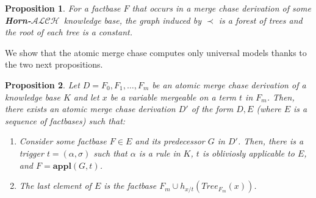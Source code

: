 \documentclass{article}
\newtheorem{proposition}{Proposition}[section]
\theoremstyle{definition}
\newtheorem{definition}{Definition}[section]
\theoremstyle{remark}
\newcommand{\Appl}{\textbf{appl}}
\newcommand{\Tree}{\textit{Tree}}
\newcommand{\ALCH}{\textbf{Horn-$\mathcal{ALCH}$}}
\begin{document}
\begin{proposition}
For a factbase $F$ that occurs in a merge chase derivation of some \ALCH\ knowledge base, the graph induced by $\prec$ is a forest of trees and the root of each tree is a constant.
\end{proposition}




%












We show that the atomic merge chase computes only universal models thanks to the two next propositions.

\begin{proposition} \label{step1}
	Let $D = F_0,F_1,\ldots,F_m$ be an atomic merge chase derivation of a knowledge base $K$
	and let $x$ be a variable mergeable on a term $t$ in $F_m$.
	Then, there exists an atomic merge chase derivation $D'$ of the form $D, E$ (where $E$ is a sequence of factbases) such that:
	\begin{enumerate}
	\item Consider some factbase $F \in E$ and its predecessor $G$ in $D'$.
	Then, there is a trigger $t = (\alpha, \sigma)$ such that $\alpha$ is a rule in $K$, $t$ is obliviosly applicable to $E$, and $F = \Appl(G, t)$.
	\item The last element of $E$ is the factbase $F_m \cup h_{x/t}(\Tree_{F_m}(x))$. 
	\end{enumerate}
	\end{proposition}
\end{document}
